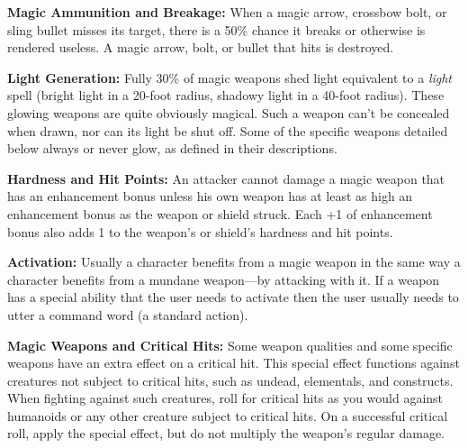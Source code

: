 \textbf{Magic Ammunition and Breakage:} When a magic arrow, crossbow bolt, or sling 
bullet misses its target, there is a 50\% chance it breaks or otherwise is rendered 
useless. A magic arrow, bolt, or bullet that hits is destroyed.

\textbf{Light Generation:} Fully 30\% of magic weapons shed light equivalent to 
a \textit{light }spell (bright light in a 20-foot radius, shadowy light in a 40-foot 
radius). These glowing weapons are quite obviously magical. Such a weapon can't 
be concealed when drawn, nor can its light be shut off. Some of the specific weapons 
detailed below always or never glow, as defined in their descriptions.

\textbf{Hardness and Hit Points:} An attacker cannot damage a magic weapon that 
has an enhancement bonus unless his own weapon has at least as high an enhancement 
bonus as the weapon or shield struck. Each +1 of enhancement bonus also adds 1 
to the weapon's or shield's hardness and hit points.

\textbf{Activation:} Usually a character benefits from a magic weapon in the same 
way a character benefits from a mundane weapon---by attacking with it. If a weapon 
has a special ability that the user needs to activate then the user usually needs 
to utter a command word (a standard action).

\textbf{Magic Weapons and Critical Hits:} Some weapon qualities and some specific 
weapons have an extra effect on a critical hit. This special effect functions against 
creatures not subject to critical hits, such as undead, elementals, and constructs. 
When fighting against such creatures, roll for critical hits as you would against 
humanoids or any other creature subject to critical hits. On a successful critical 
roll, apply the special effect, but do not multiply the weapon's regular damage. 

